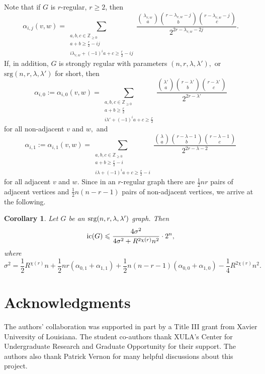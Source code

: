 \documentclass[11pt, reqno]{amsart}
\newtheorem{corollary}[theorem]{Corollary}
\theoremstyle{definition}
\renewcommand{\leq}{\leqslant}
\renewcommand{\geq}{\geqslant}
\begin{document}
Note that if $G$ is $r$-regular, $r \geq 2$, then
\begin{equation}
\alpha_{i,j}(v,w) = \sum_{\substack{a,b,c \in \mathbb{Z}_{\geq 0} \\ a + b \geq \frac{r}{2}-ij \\ i\lambda_{v,w}+(-1)^{i}a + c \geq \frac{r}{2}-ij}} \frac{\binom{\lambda_{v,w}}{a}\binom{r-\lambda_{v,w}-j}{b}\binom{r-\lambda_{v,w}-j}{c}}{2^{2r-\lambda_{v,w}-2j}}.
\end{equation}
If, in addition, $G$ is strongly regular with parameters $(n,r,\lambda,\lambda'),$ or $\text{srg}(n,r,\lambda,\lambda')$ for short, then
\begin{equation}
\alpha_{i,0} :=\alpha_{i,0}(v, w) = \sum_{\substack{a,b,c \in \mathbb{Z}_{\geq 0} \\ a + b \geq \frac{r}{2} \\ i\lambda'+(-1)^{i}a + c \geq \frac{r}{2}}} \frac{\binom{\lambda'}{a}\binom{r-\lambda'}{b}\binom{r-\lambda'}{c}}{2^{2r-\lambda'}}
\end{equation}
for all non-adjacent $v$ and $w,$ and
\begin{equation}
\alpha_{i,1} := \alpha_{i,1}(v, w) = \sum_{\substack{a,b,c \in \mathbb{Z}_{\geq 0} \\ a + b \geq \frac{r}{2}-i \\ i\lambda+(-1)^{i}a + c \geq \frac{r}{2}-i}} \frac{\binom{\lambda}{a}\binom{r-\lambda-1}{b}\binom{r-\lambda-1}{c}}{2^{2r-\lambda-2}}
\end{equation}
for all adjacent $v$ and $w.$ Since in an $r$-regular graph there are $\frac{1}{2}nr$ pairs of adjacent vertices and $\frac{1}{2}n(n-r-1)$ pairs of non-adjacent vertices, we arrive at the following.

\begin{corollary}
Let $G$ be an $\textup{srg}(n,r,\lambda,\lambda')$ graph. Then
\[\textup{ic}(G) \leq \frac{4\sigma^2}{4\sigma^2+R^{2\chi(r)}n^2}\cdot2^{n},\]
where
\[\sigma^2 = \frac{1}{2}R^{\chi(r)}n + \frac{1}{2}nr(\alpha_{0,1} + \alpha_{1,1}) + \frac{1}{2}n(n-r-1)(\alpha_{0,0} + \alpha_{1,0}) - \frac{1}{4}R^{2\chi(r)}n^2.\]
\end{corollary}

\section*{Acknowledgments}

The authors' collaboration was supported in part by a Title III grant from Xavier University of Louisiana. The student co-authors thank XULA's Center for Undergraduate Research and Graduate Opportunity for their support. The authors also thank Patrick Vernon for many helpful discussions about this project.
\end{document}

